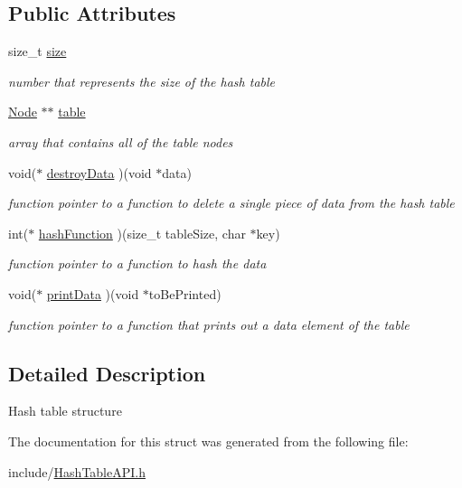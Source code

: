 \subsection*{Public Attributes}
\begin{DoxyCompactItemize}
\item 
\mbox{\label{structHTable_a6ede6f5f1f743298425e0832cfd24a4a}} 
size\+\_\+t \hyperlink{structHTable_a6ede6f5f1f743298425e0832cfd24a4a}{size}
\begin{DoxyCompactList}\small\item\em number that represents the size of the hash table \end{DoxyCompactList}\item 
\mbox{\label{structHTable_ad8f77b5519a173524eee87a5ebb380a0}} 
\hyperlink{structNode}{Node} $\ast$$\ast$ \hyperlink{structHTable_ad8f77b5519a173524eee87a5ebb380a0}{table}
\begin{DoxyCompactList}\small\item\em array that contains all of the table nodes \end{DoxyCompactList}\item 
\mbox{\label{structHTable_a05b3109f3bbfa3fd4b3e55c0bbd29b8a}} 
void($\ast$ \hyperlink{structHTable_a05b3109f3bbfa3fd4b3e55c0bbd29b8a}{destroy\+Data} )(void $\ast$data)
\begin{DoxyCompactList}\small\item\em function pointer to a function to delete a single piece of data from the hash table \end{DoxyCompactList}\item 
\mbox{\label{structHTable_a0e418d66d4114826c3f9905084e0b9c7}} 
int($\ast$ \hyperlink{structHTable_a0e418d66d4114826c3f9905084e0b9c7}{hash\+Function} )(size\+\_\+t table\+Size, char $\ast$key)
\begin{DoxyCompactList}\small\item\em function pointer to a function to hash the data \end{DoxyCompactList}\item 
\mbox{\label{structHTable_a573abbe70757c842d491ff15d827c002}} 
void($\ast$ \hyperlink{structHTable_a573abbe70757c842d491ff15d827c002}{print\+Data} )(void $\ast$to\+Be\+Printed)
\begin{DoxyCompactList}\small\item\em function pointer to a function that prints out a data element of the table \end{DoxyCompactList}\end{DoxyCompactItemize}


\subsection{Detailed Description}
Hash table structure 

The documentation for this struct was generated from the following file\+:\begin{DoxyCompactItemize}
\item 
include/\hyperlink{HashTableAPI_8h}{Hash\+Table\+A\+P\+I.\+h}\end{DoxyCompactItemize}
